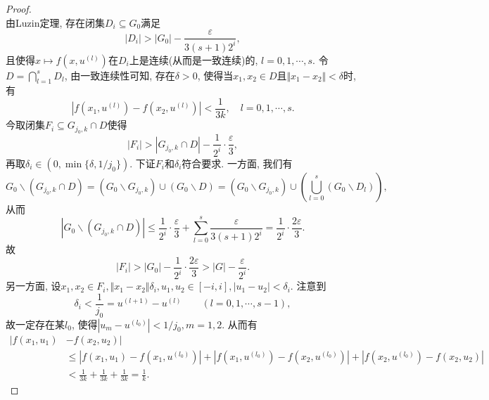 \begin{lemma}
\begin{proof}
\begin{equation*}
        \end{equation*}
        由Luzin定理, 存在闭集$D_i \subseteq G_0$满足 
        \begin{equation*}
            |D_i| > |G_0| - \frac{\varepsilon}{3(s + 1)2^i},
        \end{equation*}
        且使得$x \mapsto f(x, u^{(l)})$在$D_i$上是连续(从而是一致连续)的, $l = 0, 1, \cdots, s$. 令$D = \bigcap_{l = 1}^sD_l$, 由一致连续性可知, 存在$\delta > 0$, 使得当$x_1, x_2 \in D$且$\Vert x_1 - x_2 \Vert < \delta$时, 有 
        \begin{equation*}
            |f(x_1, u^{(l)}) - f(x_2, u^{(l)})| < \frac{1}{3k}, \quad l = 0, 1, \cdots, s.
        \end{equation*}
        今取闭集$F_i \subseteq G_{j_0, k} \cap D$使得 
        \begin{equation*}
            |F_i| > |G_{j_0, k} \cap D| - \frac{1}{2^i} \cdot \frac{\varepsilon}{3},
        \end{equation*}
        再取$\delta_i \in (0, \min\{\delta, 1/j_0\})$. 下证$F_i$和$\delta_i$符合要求. 一方面, 我们有 
        \begin{equation*}
            G_0 \smallsetminus (G_{j_0, k} \cap D) = (G_0 \smallsetminus G_{j_0, k}) \cup (G_0 \smallsetminus D) = (G_0 \smallsetminus G_{j_0, k}) \cup \left(\bigcup_{l = 0}^s(G_0 \smallsetminus D_l)\right),
        \end{equation*}
        从而 
        \begin{equation*}
            |G_0 \smallsetminus (G_{j_0, k} \cap D)| \leq \frac{1}{2^i} \cdot \frac{\varepsilon}{3} + \sum_{l = 0}^s\frac{\varepsilon}{3(s + 1)2^i} = \frac{1}{2^i} \cdot \frac{2\varepsilon}{3}.
        \end{equation*}
        故 
        \begin{equation*}
            |F_i| > |G_0| - \frac{1}{2^i} \cdot \frac{2\varepsilon}{3} > |G| - \frac{\varepsilon}{2^i}.
        \end{equation*}
        另一方面, 设$x_1, x_2 \in F_i, \Vert x_1 - x_2 \Vert \delta_i, u_1, u_2 \in [-i, i], |u_1 - u_2| < \delta_i$. 注意到
        \begin{equation*}
            \delta_i < \frac{1}{j_0} = u^{(l + 1)} - u^{(l)} \qquad (l = 0, 1, \cdots, s - 1),
        \end{equation*}
        故一定存在某$l_0$, 使得$|u_m - u^{(l_0)}| < 1/j_0, m = 1, 2$. 从而有 
        \begin{align*}
            |f(x_1, u_1)& - f(x_2, u_2)| \\
            &\leq |f(x_1, u_1) - f(x_1, u^{(l_0)})| + |f(x_1, u^{(l_0)}) - f(x_2, u^{(l_0)})| + |f(x_2, u^{(l_0)}) - f(x_2, u_2)| \\
            &< \frac{1}{3k} + \frac{1}{3k} + \frac{1}{3k} = \frac{1}{k}.
        \end{align*}
    \end{proof}
\end{lemma}

